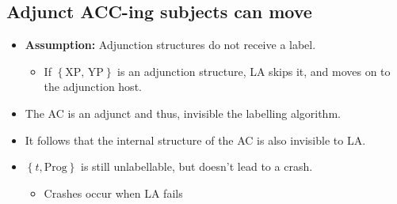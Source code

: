 \documentclass[letterpaper]{article}
\begin{document}
\subsection{Adjunct ACC-ing subjects can move}
\begin{itemize}
  \item \textbf{Assumption:} Adjunction structures do not receive a label. \parencite{hornstein2009theory,chametzky1996theory}
    \begin{itemize}
	    \item If $\left\{ \text{XP, YP} \right\}$ is an adjunction structure, LA skips it, and moves on to the adjunction host.
    \end{itemize}
  \item The AC is an adjunct and thus, invisible the labelling algorithm.
  \item It follows that the internal structure of the AC is also invisible to LA.
  \item $\left\{ t, \text{Prog} \right\}$ is still unlabellable, but doesn't lead to a crash.
\begin{itemize}
	\item Crashes occur when LA fails
\end{itemize}
\end{itemize}
\end{document}
